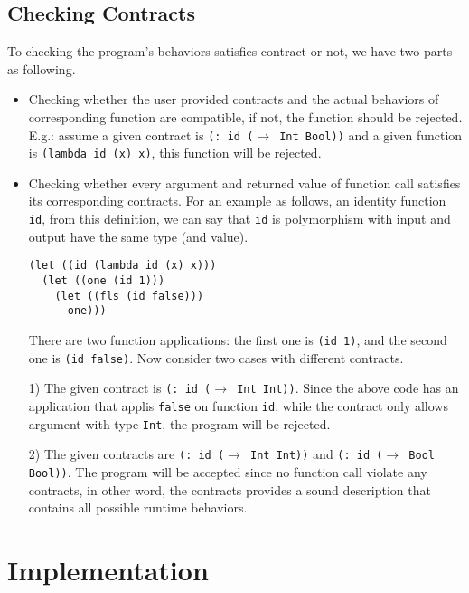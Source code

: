 \documentclass[paper=a4, fontsize=11pt]{scrartcl} %
\numberwithin{equation}{section} %
\numberwithin{figure}{section} %
\numberwithin{table}{section} %
\begin{document}
\subsection{Checking Contracts}
To checking the program's behaviors satisfies contract or not, we have two parts as following.

\begin{itemize}
\item Checking whether the user provided contracts and the actual behaviors of corresponding function are compatible, if not, the function should be rejected. E.g.: assume a given contract is \texttt{(: id ($\rightarrow$ Int Bool))} and a given function is \texttt{(lambda\ id\ (x)\ x)}, this function will be rejected.

\item Checking whether every argument and returned value of function call satisfies its corresponding contracts. For an example as follows, an identity function \texttt{id}, from this definition, we can say that \texttt{id} is polymorphism with input and output have the same type (and value).

\begin{verbatim}
(let ((id (lambda id (x) x)))
  (let ((one (id 1)))
    (let ((fls (id false)))
      one)))
\end{verbatim}

There are two function applications: the first one is \texttt{(id 1)}, and the second one is \texttt{(id false)}. Now consider two cases with different contracts.

1) The given contract is \texttt{(: id ($\rightarrow$ Int Int))}. Since the above code has an application that applis \texttt{false} on function \texttt{id}, while the contract only allows argument with type \texttt{Int}, the program will be rejected.

2) The given contracts are \texttt{(: id ($\rightarrow$ Int Int))} and \texttt{(: id ($\rightarrow$ Bool Bool))}. The program will be accepted since no function call violate any contracts, in other word, the contracts provides a sound description that contains all possible runtime behaviors.
\end{itemize}



\section{Implementation}
\end{document}
